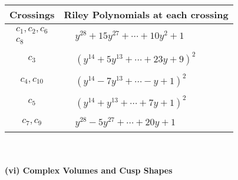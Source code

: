 \documentclass[1p]{elsarticle_modified}
\theoremstyle{definition}
\begin{document}
\begin{tabular}{m{50pt}|m{274pt}}
Crossings & \hspace{64pt}Riley Polynomials at each crossing \\
\hline $$\begin{aligned}c_{1},c_{2},c_{6}\\c_{8}\end{aligned}$$&$\begin{aligned}
&y^{28}+15 y^{27}+\cdots+10 y^2+1
\end{aligned}$\\
\hline $$\begin{aligned}c_{3}\end{aligned}$$&$\begin{aligned}
&(y^{14}+5 y^{13}+\cdots+23 y+9)^{2}
\end{aligned}$\\
\hline $$\begin{aligned}c_{4},c_{10}\end{aligned}$$&$\begin{aligned}
&(y^{14}-7 y^{13}+\cdots- y+1)^{2}
\end{aligned}$\\
\hline $$\begin{aligned}c_{5}\end{aligned}$$&$\begin{aligned}
&(y^{14}+y^{13}+\cdots+7 y+1)^{2}
\end{aligned}$\\
\hline $$\begin{aligned}c_{7},c_{9}\end{aligned}$$&$\begin{aligned}
&y^{28}-5 y^{27}+\cdots+20 y+1
\end{aligned}$\\
\hline
\end{tabular}\\~\\
\newpage\flushleft \textbf{(vi) Complex Volumes and Cusp Shapes}
\end{document}
